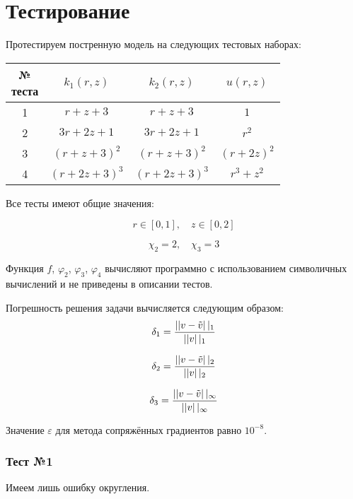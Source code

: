 \section{Тестирование}

Протестируем постренную модель на следующих тестовых наборах:

\begin{center}
  \begin{tabular}{*4{c}}
  \toprule
  \makecell{№ \\ теста} & $k_1(r, z)$ & $k_2(r, z)$ & $ u(r, z)$ \\
  \midrule
  1 & $ r + z + 3 $ & $ r + z + 3 $ & $1$ \\
  2 & $ 3r + 2z + 1 $ & $ 3r + 2z + 1 $ & $r^2$ \\
  3 & $ (r + z + 3)^2 $ & $ (r + z + 3)^2 $ & $(r + 2z)^2$ \\
  4 & $ (r + 2z + 3)^3 $ & $ (r + 2z + 3)^3 $ & $r^3 + z^2$ \\
  \bottomrule
  \end{tabular}
\end{center}

Все тесты имеют общие значения:

\[
  r \in [0, 1],\quad z \in [0, 2]
\]

\[
  \chi_2 = 2,\quad \chi_3 = 3
\]

Функция $f$, $ \varphi_2 $, $ \varphi_3 $, $\varphi_4$ вычисляют программно
с использованием символичных вычислений и не приведены в описании тестов.

Погрешность решения задачи вычисляется следующим образом:
\[
\delta_1 = \frac{\left|| v - \Tilde{v} \right||_1 }{\left|| v \right||_1 }
\]

\[
\delta_2 = \frac{\left|| v - \Tilde{v} \right||_2 }{\left|| v \right||_2 }
\]

\[
\delta_3 = \frac{\left|| v - \Tilde{v} \right||_\infty }{\left|| v \right||_\infty }
\]

Значение $ \varepsilon $ для метода сопряжённых градиентов равно $ 10^{-8} $.

\subsubsection*{Тест №1}

Имеем лишь ошибку округления.

